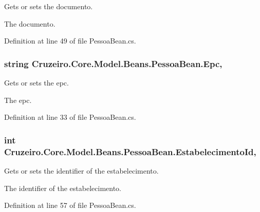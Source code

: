 Gets or sets the documento. 

The documento. 

Definition at line 49 of file Pessoa\+Bean.\+cs.

\subsubsection[{\texorpdfstring{Epc}{Epc}}]{\setlength{\rightskip}{0pt plus 5cm}string Cruzeiro.\+Core.\+Model.\+Beans.\+Pessoa\+Bean.\+Epc\hspace{0.3cm}{\ttfamily [get]}, {\ttfamily [set]}}\hypertarget{class_cruzeiro_1_1_core_1_1_model_1_1_beans_1_1_pessoa_bean_a3e75bdd854ef96dae45ccda53240716e}{}\label{class_cruzeiro_1_1_core_1_1_model_1_1_beans_1_1_pessoa_bean_a3e75bdd854ef96dae45ccda53240716e}


Gets or sets the epc. 

The epc. 

Definition at line 33 of file Pessoa\+Bean.\+cs.

\subsubsection[{\texorpdfstring{Estabelecimento\+Id}{EstabelecimentoId}}]{\setlength{\rightskip}{0pt plus 5cm}int Cruzeiro.\+Core.\+Model.\+Beans.\+Pessoa\+Bean.\+Estabelecimento\+Id\hspace{0.3cm}{\ttfamily [get]}, {\ttfamily [set]}}\hypertarget{class_cruzeiro_1_1_core_1_1_model_1_1_beans_1_1_pessoa_bean_a1914e359c48dd3e0f68b434332f29d5a}{}\label{class_cruzeiro_1_1_core_1_1_model_1_1_beans_1_1_pessoa_bean_a1914e359c48dd3e0f68b434332f29d5a}


Gets or sets the identifier of the estabelecimento. 

The identifier of the estabelecimento. 

Definition at line 57 of file Pessoa\+Bean.\+cs.

